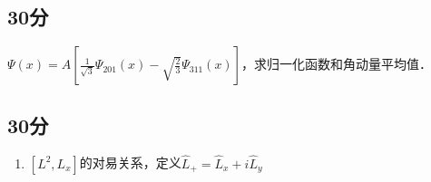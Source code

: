 
\subsection{30分}
$\varPsi (x)=A[\frac{1}{\sqrt{3}}\varPsi_{201}(x)-\sqrt{\frac{2}{3}}\varPsi_{311}(x)]$，求归一化函数和角动量平均值．
\subsection{30分}
\begin{enumerate}
\item $[L^{2},L_{x}]$的对易关系，定义$\hat{L}_{+}=\hat{L}_{x}+i\hat{L}_{y}$
\end{enumerate}